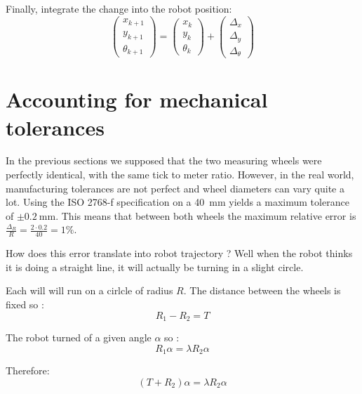 \documentclass[a4paper]{IEEEtran}
\begin{document}
Finally, integrate the change into the robot position:
\begin{equation}
    \begin{pmatrix}
        x_{k+1}\\
        y_{k+1}\\
        \theta_{k+1}
    \end{pmatrix}
    =
    \begin{pmatrix}
        x_{k}\\
        y_{k}\\
        \theta_{k}
    \end{pmatrix}
    +
    \begin{pmatrix}
        \Delta_x\\\Delta_y\\\Delta_\theta
    \end{pmatrix}
\end{equation}


\section{Accounting for mechanical tolerances}
In the previous sections we supposed that the two measuring wheels were perfectly identical, with the same tick to meter ratio.
However, in the real world, manufacturing tolerances are not perfect and wheel diameters can vary quite a lot.
Using the ISO 2768-f specification on a \SI{40}{\milli\meter} yields a maximum tolerance of $\pm \SI{0.2}{\milli\meter}$.
This means that between both wheels the maximum relative error is $\frac{\Delta_R}{R} = \frac{2 \cdot 0.2}{40} = 1\% $.

How does this error translate into robot trajectory ?
Well when the robot thinks it is doing a straight line, it will actually be turning in a slight circle.

Each will will run on a cirlcle of radius $R$.
The distance between the wheels is fixed so :
\begin{equation}
    R_1 - R_2 = T
\end{equation}

The robot turned of a given angle $\alpha$ so :
\begin{equation}
    R_1 \alpha = \lambda R_2 \alpha
\end{equation}

Therefore:
\begin{equation}
    (T + R_2) \alpha = \lambda R_2 \alpha
\end{equation}
\end{document}
